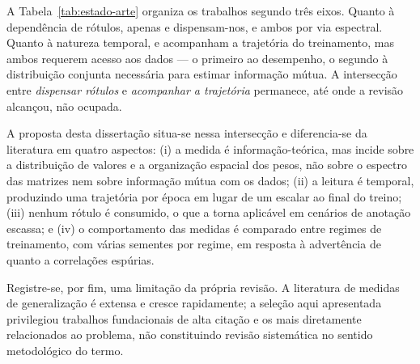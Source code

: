 A Tabela~\ref{tab:estado-arte} organiza os trabalhos segundo três eixos. Quanto
à dependência de rótulos, apenas  e
 dispensam-nos, e ambos por via espectral. Quanto à
natureza temporal,  e 
acompanham a trajetória do treinamento, mas ambos requerem acesso aos dados ---
o primeiro ao desempenho, o segundo à distribuição conjunta necessária para
estimar informação mútua. A intersecção entre \emph{dispensar rótulos} e
\emph{acompanhar a trajetória} permanece, até onde a revisão alcançou, não
ocupada.

A proposta desta dissertação situa-se nessa intersecção e diferencia-se da
literatura em quatro aspectos: (i) a medida é informação-teórica, mas incide
sobre a distribuição de valores e a organização espacial dos pesos, não sobre o
espectro das matrizes nem sobre informação mútua com os dados; (ii) a leitura é
temporal, produzindo uma trajetória por época em lugar de um escalar ao final do
treino; (iii) nenhum rótulo é consumido, o que a torna aplicável em cenários de
anotação escassa; e (iv) o comportamento das medidas é comparado entre regimes
de treinamento, com várias sementes por regime, em resposta à advertência de
 quanto a correlações espúrias.

Registre-se, por fim, uma limitação da própria revisão. A literatura de medidas
de generalização é extensa e cresce rapidamente; a seleção aqui apresentada
privilegiou trabalhos fundacionais de alta citação e os mais diretamente
relacionados ao problema, não constituindo revisão sistemática no sentido
metodológico do termo.
